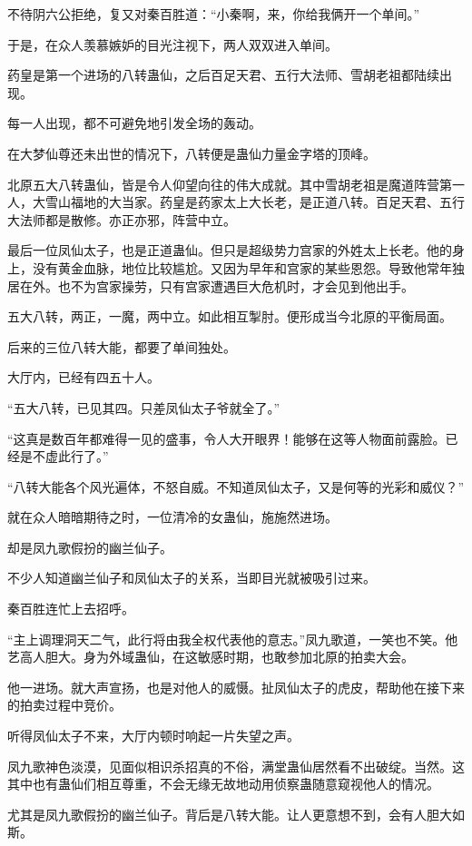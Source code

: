 \begin{this_body}
不待阴六公拒绝，复又对秦百胜道：“小秦啊，来，你给我俩开一个单间。”

于是，在众人羡慕嫉妒的目光注视下，两人双双进入单间。

药皇是第一个进场的八转蛊仙，之后百足天君、五行大法师、雪胡老祖都陆续出现。

每一人出现，都不可避免地引发全场的轰动。

在大梦仙尊还未出世的情况下，八转便是蛊仙力量金字塔的顶峰。

北原五大八转蛊仙，皆是令人仰望向往的伟大成就。其中雪胡老祖是魔道阵营第一人，大雪山福地的大当家。药皇是药家太上大长老，是正道八转。百足天君、五行大法师都是散修。亦正亦邪，阵营中立。

最后一位凤仙太子，也是正道蛊仙。但只是超级势力宫家的外姓太上长老。他的身上，没有黄金血脉，地位比较尴尬。又因为早年和宫家的某些恩怨。导致他常年独居在外。也不为宫家操劳，只有宫家遭遇巨大危机时，才会见到他出手。

五大八转，两正，一魔，两中立。如此相互掣肘。便形成当今北原的平衡局面。

后来的三位八转大能，都要了单间独处。

大厅内，已经有四五十人。

“五大八转，已见其四。只差凤仙太子爷就全了。”

“这真是数百年都难得一见的盛事，令人大开眼界！能够在这等人物面前露脸。已经是不虚此行了。”

“八转大能各个风光遍体，不怒自威。不知道凤仙太子，又是何等的光彩和威仪？”

就在众人暗暗期待之时，一位清冷的女蛊仙，施施然进场。

却是凤九歌假扮的幽兰仙子。

不少人知道幽兰仙子和凤仙太子的关系，当即目光就被吸引过来。

秦百胜连忙上去招呼。

“主上调理洞天二气，此行将由我全权代表他的意志。”凤九歌道，一笑也不笑。他艺高人胆大。身为外域蛊仙，在这敏感时期，也敢参加北原的拍卖大会。

他一进场。就大声宣扬，也是对他人的威慑。扯凤仙太子的虎皮，帮助他在接下来的拍卖过程中竞价。

听得凤仙太子不来，大厅内顿时响起一片失望之声。

凤九歌神色淡漠，见面似相识杀招真的不俗，满堂蛊仙居然看不出破绽。当然。这其中也有蛊仙们相互尊重，不会无缘无故地动用侦察蛊随意窥视他人的情况。

尤其是凤九歌假扮的幽兰仙子。背后是八转大能。让人更意想不到，会有人胆大如斯。


\end{this_body}
